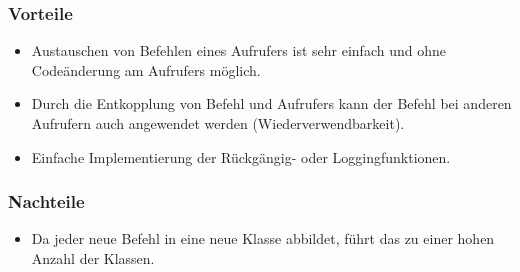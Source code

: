 \subsubsection{Vorteile}
\begin{itemize}
\item Austauschen von Befehlen eines Aufrufers ist sehr einfach und ohne Codeänderung am Aufrufers möglich.
\item Durch die Entkopplung von Befehl und Aufrufers kann der Befehl bei anderen Aufrufern auch angewendet werden (Wiederverwendbarkeit).
\item Einfache Implementierung der Rückgängig- oder Loggingfunktionen.
\end{itemize}

\subsubsection{Nachteile}
\begin{itemize}
\item Da jeder neue Befehl in eine neue Klasse abbildet, führt das zu einer hohen Anzahl der Klassen.
\end{itemize}
